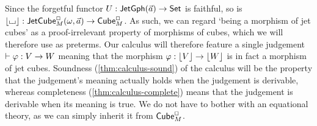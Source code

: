 \documentclass[a4paper]{memoir}
\begin{document}
Since the forgetful functor $U : \mathsf{JetGph}(\vec a) \to {\mathsf{Set}}$ is faithful, so is $\mathopen{}\left\lfloor {\llcorner\hspace{-.4ex}\lrcorner} \right\rfloor\mathclose{} : \mathsf{JetCube}^{\Box}_{M}(\omega,\vec a) \to {\mathsf{Cube}}^\Box_M$.
As such, we can regard `being a morphism of jet cubes' as a proof-irrelevant property of morphisms of cubes, which we will therefore use as preterms.
Our calculus will therefore feature a single judgement $\vdash \varphi : V \to W$ meaning that the morphism $\varphi : \mathopen{}\left\lfloor V \right\rfloor\mathclose{} \to \mathopen{}\left\lfloor W \right\rfloor\mathclose{}$ is in fact a morphism of jet cubes.
Soundness (\cref{thm:calculus-sound}) of the calculus will be the property that the judgement's meaning actually holds when the judgement is derivable, whereas completeness (\cref{thm:calculus-complete}) means that the judgement is derivable when its meaning is true.
We do not have to bother with an equational theory, as we can simply inherit it from ${\mathsf{Cube}}_M^\Box$.
\end{document}
